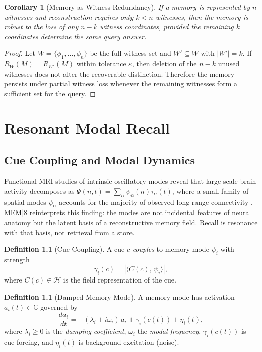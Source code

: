 \documentclass[12pt, oneside]{book}
\theoremstyle{plain}
\newtheorem{corollary}[theorem]{Corollary}
\theoremstyle{definition}
\newtheorem{definition}[theorem]{Definition}
\theoremstyle{remark}
\newcommand{\calH}{\mathcal{H}}
\newcommand{\CC}{\mathbb{C}}
\begin{document}
\begin{corollary}[Memory as Witness Redundancy]
\label{cor:witness-redundancy}
If a memory is represented by $n$ witnesses and
reconstruction requires only $k < n$ witnesses,
then the memory is robust to the loss of any $n - k$
witness coordinates, provided the remaining $k$
coordinates determine the same query answer.
\end{corollary}

\begin{proof}
Let $W = \{\phi_1, \ldots, \phi_n\}$ be the full witness
set and $W' \subseteq W$ with $|W'| = k$.
If $R_W(M) = R_{W'}(M)$ within tolerance $\varepsilon$,
then deletion of the $n - k$ unused witnesses does not
alter the recoverable distinction.
Therefore the memory persists under partial witness loss
whenever the remaining witnesses form a sufficient set
for the query.
\end{proof}

\chapter{Resonant Modal Recall}

\section{Cue Coupling and Modal Dynamics}

Functional MRI studies of intrinsic oscillatory modes
reveal that large-scale brain activity decomposes as
$\Psi(n, t) = \sum_\alpha \psi_\alpha(n)\tau_\alpha(t)$,
where a small family of spatial modes $\psi_\alpha$
accounts for the majority of observed long-range
connectivity \cite{Cabral2023OscillatoryModes}.
MEM|8 reinterprets this finding: the modes are not
incidental features of neural anatomy but the latent
basis of a reconstructive memory field.
Recall is resonance with that basis, not retrieval
from a store.

\begin{definition}[Cue Coupling]
A cue $c$ \emph{couples} to memory mode $\psi_i$ with
strength
\[
  \gamma_i(c) = |\langle C(c),\, \psi_i\rangle|,
\]
where $C(c) \in \calH$ is the field representation
of the cue.
\end{definition}

\begin{definition}[Damped Memory Mode]
A memory mode has activation $a_i(t) \in \CC$ governed by
\[
  \frac{d a_i}{dt}
  = -(\lambda_i + i\omega_i)\,a_i
    + \gamma_i(c(t))
    + \eta_i(t),
\]
where $\lambda_i \geq 0$ is the \emph{damping coefficient},
$\omega_i$ the \emph{modal frequency},
$\gamma_i(c(t))$ is cue forcing, and
$\eta_i(t)$ is background excitation (noise).
\end{definition}
\end{document}
